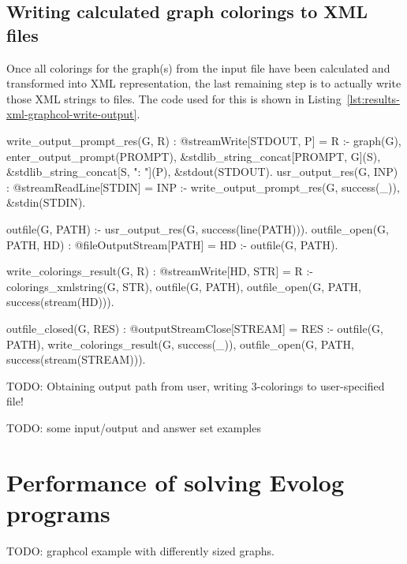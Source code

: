 \subsection{Writing calculated graph colorings to XML files}

Once all colorings for the graph(s) from the input file have been calculated and transformed into XML representation, the last remaining step is to actually write those XML strings to files. The code used for this is shown in Listing~\ref{lst:results-xml-graphcol-write-output}.

write_output_prompt_res(G, R) : @streamWrite[STDOUT, P] = R :- 
	graph(G), enter_output_prompt(PROMPT), 
	&stdlib_string_concat[PROMPT, G](S),
	&stdlib_string_concat[S, ": "](P),
	&stdout(STDOUT).
usr_output_res(G, INP) : @streamReadLine[STDIN] = INP :- write_output_prompt_res(G, success(_)), &stdin(STDIN).

outfile(G, PATH) :- usr_output_res(G, success(line(PATH))).
outfile_open(G, PATH, HD) : @fileOutputStream[PATH] = HD :- outfile(G, PATH).

write_colorings_result(G, R) : @streamWrite[HD, STR] = R :- 
	colorings_xmlstring(G, STR), 
	outfile(G, PATH), 
	outfile_open(G, PATH, success(stream(HD))).

outfile_closed(G, RES) : @outputStreamClose[STREAM] = RES :- 
	outfile(G, PATH), write_colorings_result(G, success(_)), 
	outfile_open(G, PATH, success(stream(STREAM))).



TODO: Obtaining output path from user, writing 3-colorings to user-specified file!

TODO: some input/output and answer set examples

\section{Performance of solving Evolog programs}

TODO: graphcol example with differently sized graphs.